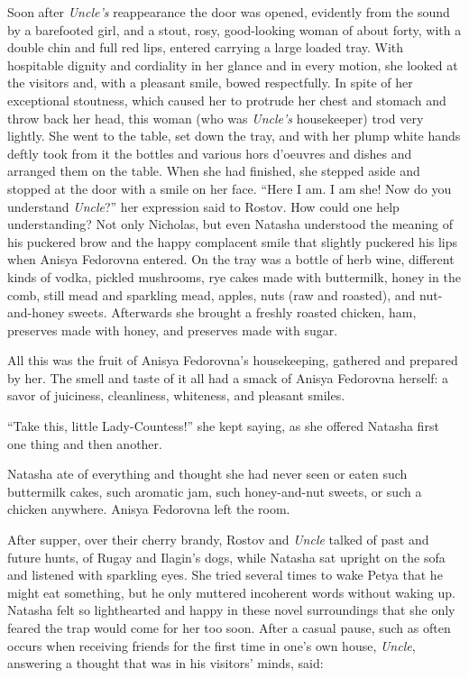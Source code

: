 Soon after \emph{Uncle's} reappearance the door was opened,
evidently from the sound by a barefooted girl, and a stout, rosy,
good-looking woman of about forty, with a double chin and full
red lips, entered carrying a large loaded tray. With hospitable
dignity and cordiality in her glance and in every motion, she
looked at the visitors and, with a pleasant smile, bowed
respectfully. In spite of her exceptional stoutness, which caused
her to protrude her chest and stomach and throw back her head,
this woman (who was \emph{Uncle's} housekeeper) trod very
lightly. She went to the table, set down the tray, and with her
plump white hands deftly took from it the bottles and various
hors d'oeuvres and dishes and arranged them on the table. When
she had finished, she stepped aside and stopped at the door with
a smile on her face. ``Here I am. I am she! Now do you understand
\emph{Uncle}?'' her expression said to Rostov. How could one help
understanding? Not only Nicholas, but even Natasha understood the
meaning of his puckered brow and the happy complacent smile that
slightly puckered his lips when Anisya Fedorovna entered. On the
tray was a bottle of herb wine, different kinds of vodka, pickled
mushrooms, rye cakes made with buttermilk, honey in the comb,
still mead and sparkling mead, apples, nuts (raw and roasted),
and nut-and-honey sweets. Afterwards she brought a freshly
roasted chicken, ham, preserves made with honey, and preserves
made with sugar.

All this was the fruit of Anisya Fedorovna's housekeeping,
gathered and prepared by her. The smell and taste of it all had a
smack of Anisya Fedorovna herself: a savor of juiciness,
cleanliness, whiteness, and pleasant smiles.

``Take this, little Lady-Countess!'' she kept saying, as she
offered Natasha first one thing and then another.

Natasha ate of everything and thought she had never seen or eaten
such buttermilk cakes, such aromatic jam, such honey-and-nut
sweets, or such a chicken anywhere. Anisya Fedorovna left the
room.

After supper, over their cherry brandy, Rostov and \emph{Uncle}
talked of past and future hunts, of Rugay and Ilagin's dogs,
while Natasha sat upright on the sofa and listened with sparkling
eyes. She tried several times to wake Petya that he might eat
something, but he only muttered incoherent words without waking
up. Natasha felt so lighthearted and happy in these novel
surroundings that she only feared the trap would come for her too
soon. After a casual pause, such as often occurs when receiving
friends for the first time in one's own house, \emph{Uncle},
answering a thought that was in his visitors' minds, said:

